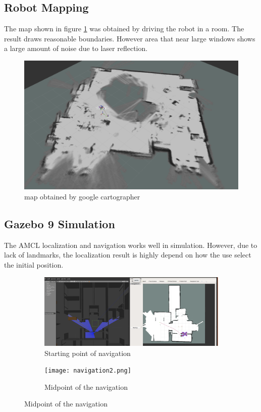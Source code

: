\documentclass[letterpaper, 10 pt, conference]{ieeeconf}  %
\begin{document}
\subsection{Robot Mapping}
The map shown in figure \ref{fig:map} was obtained by driving the robot in a room. The result draws reasonable boundaries. However area that near large windows shows a large amount of noise due to laser reflection. 
\begin{figure}[ht]
  \includegraphics[width=\linewidth]{map.png}
  \caption{map obtained by google cartographer} 
  \label{fig:map}
\end{figure}
\subsection{Gazebo 9 Simulation}
The AMCL localization and navigation works well in simulation. However, due to lack of landmarks, the localization result is highly depend on how the use select the initial position.
    \begin{figure}[ht]
    \begin{subfigure}[b]{0.5\textwidth}
       \includegraphics[width=1\linewidth]{navigation.png}
       \caption{Starting point of navigation}
       \label{fig:Ng1} 
    \end{subfigure}
    
    \begin{subfigure}[b]{0.5\textwidth}
       \texttt{[image: navigation2.png]}
       \caption{Midpoint of the navigation}
       \label{fig:Ng2}
    \end{subfigure}
\end{figure}
\end{document}
